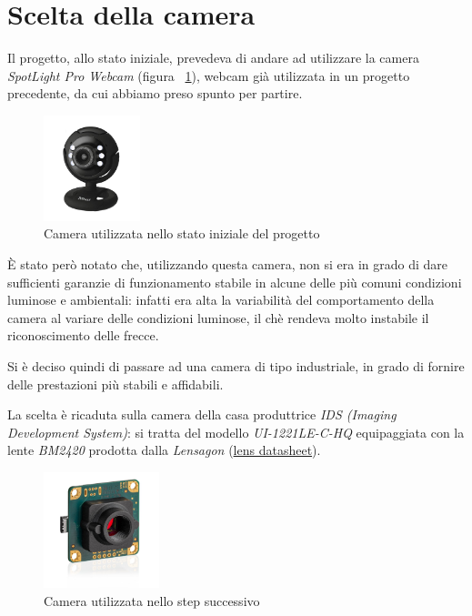 \section{Scelta della camera}
Il progetto, allo stato iniziale, prevedeva di andare ad utilizzare la camera \textit{SpotLight Pro Webcam} (figura ~\ref{fig:TrustCam}), webcam già utilizzata in un progetto precedente, da cui abbiamo preso spunto per partire.
\begin{figure}[H]
	\centering
	\includegraphics[width=0.25\textwidth]{Immagini/TrustCam.jpg}
	\caption{Camera utilizzata nello stato iniziale del progetto}
	\label{fig:TrustCam}
\end{figure}

È stato però notato che, utilizzando questa camera, non si era in grado di dare sufficienti garanzie di funzionamento stabile in alcune delle più comuni condizioni luminose e ambientali: infatti era alta la variabilità del comportamento della camera al variare delle condizioni luminose, il chè rendeva molto instabile il riconoscimento delle frecce.

Si è deciso quindi di passare ad una camera di tipo industriale, in grado di fornire delle prestazioni più stabili e affidabili.

La scelta è ricaduta sulla camera della casa produttrice \textit{IDS (Imaging Development System)}: si tratta del modello \textit{UI-1221LE-C-HQ} equipaggiata con la lente \textit{BM2420} prodotta dalla \textit{Lensagon} (\href{https://www.lensation.de/product/BM2420/}{lens datasheet}).
\begin{figure}[H]
	\centering
	\includegraphics[width=0.3\textwidth]{Immagini/camera-usb2-ueye-le-rev2-boardlevel-m12-1.jpg}
	\caption{Camera utilizzata nello step successivo}
	\label{fig:UeyeCam}
\end{figure}

